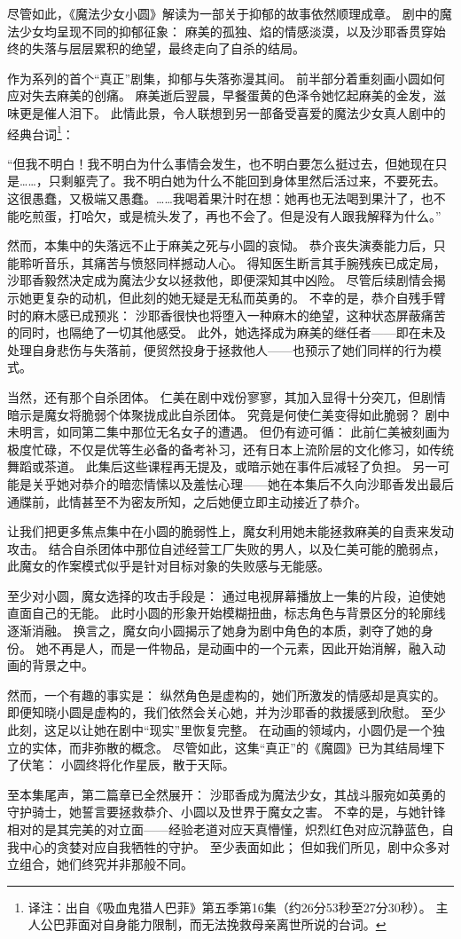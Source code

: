 尽管如此，《魔法少女小圆》解读为一部关于抑郁的故事依然顺理成章。
剧中的魔法少女均呈现不同的抑郁征象：
麻美的孤独、焰的情感淡漠，以及沙耶香贯穿始终的失落与层层累积的绝望，最终走向了自杀的结局。

作为系列的首个“真正”剧集，抑郁与失落弥漫其间。
前半部分着重刻画小圆如何应对失去麻美的创痛。
麻美逝后翌晨，早餐蛋黄的色泽令她忆起麻美的金发，滋味更是催人泪下。
此情此景，令人联想到另一部备受喜爱的魔法少女真人剧中的经典台词\footnote{%
    译注：出自《吸血鬼猎人巴菲》第五季第16集（约26分53秒至27分30秒）。
    主人公巴菲面对自身能力限制，而无法挽救母亲离世所说的台词。
}：

“但我不明白！我不明白为什么事情会发生，也不明白要怎么挺过去，但她现在只是……，只剩躯壳了。我不明白她为什么不能回到身体里然后活过来，不要死去。这很愚蠢，又极端又愚蠢。……我喝着果汁时在想：她再也无法喝到果汁了，也不能吃煎蛋，打哈欠，或是梳头发了，再也不会了。但是没有人跟我解释为什么。”
\cite{ref31}

然而，本集中的失落远不止于麻美之死与小圆的哀恸。
恭介丧失演奏能力后，只能聆听音乐，其痛苦与愤怒同样撼动人心。
得知医生断言其手腕残疾已成定局，沙耶香毅然决定成为魔法少女以拯救他，即便深知其中凶险。
尽管后续剧情会揭示她更复杂的动机，但此刻的她无疑是无私而英勇的。
不幸的是，恭介自残手臂时的麻木感已成预兆：
沙耶香很快也将堕入一种麻木的绝望，这种状态屏蔽痛苦的同时，也隔绝了一切其他感受。
此外，她选择成为麻美的继任者——即在未及处理自身悲伤与失落前，便贸然投身于拯救他人——也预示了她们同样的行为模式。

当然，还有那个自杀团体。
仁美在剧中戏份寥寥，其加入显得十分突兀，但剧情暗示是魔女将脆弱个体聚拢成此自杀团体。
究竟是何使仁美变得如此脆弱？
剧中未明言，如同第二集中那位无名女子的遭遇。
但仍有迹可循：
此前仁美被刻画为极度忙碌，不仅是优等生必备的备考补习，还有日本上流阶层的文化修习，如传统舞蹈或茶道。
此集后这些课程再无提及，或暗示她在事件后减轻了负担。
另一可能是关乎她对恭介的暗恋情愫以及羞怯心理——她在本集后不久向沙耶香发出最后通牒前，此情甚至不为密友所知，之后她便立即主动接近了恭介。

让我们把更多焦点集中在小圆的脆弱性上，魔女利用她未能拯救麻美的自责来发动攻击。
结合自杀团体中那位自述经营工厂失败的男人，以及仁美可能的脆弱点，此魔女的作案模式似乎是针对目标对象的失败感与无能感。

至少对小圆，魔女选择的攻击手段是：
通过电视屏幕播放上一集的片段，迫使她直面自己的无能。
此时小圆的形象开始模糊扭曲，标志角色与背景区分的轮廓线逐渐消融。
换言之，魔女向小圆揭示了她身为剧中角色的本质，剥夺了她的身份。
她不再是人，而是一件物品，是动画中的一个元素，因此开始消解，融入动画的背景之中。

然而，一个有趣的事实是：
纵然角色是虚构的，她们所激发的情感却是真实的。
即便知晓小圆是虚构的，我们依然会关心她，并为沙耶香的救援感到欣慰。
至少此刻，这足以让她在剧中“现实”里恢复完整。
在动画的领域内，小圆仍是一个独立的实体，而非弥散的概念。
尽管如此，这集“真正”的《魔圆》已为其结局埋下了伏笔：
小圆终将化作星辰，散于天际。

至本集尾声，第二篇章已全然展开：
沙耶香成为魔法少女，其战斗服宛如英勇的守护骑士，她誓言要拯救恭介、小圆以及世界于魔女之害。
不幸的是，与她针锋相对的是其完美的对立面——经验老道对应天真懵懂，炽烈红色对应沉静蓝色，自我中心的贪婪对应自我牺牲的守护。
至少表面如此；
但如我们所见，剧中众多对立组合，她们终究并非那般不同。
